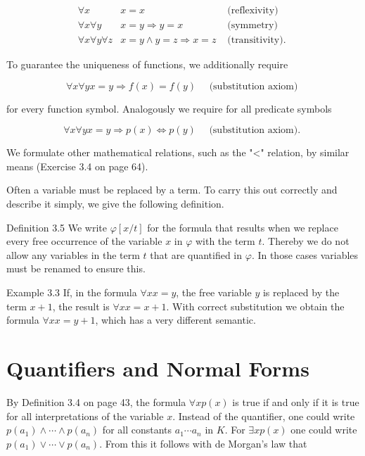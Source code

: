 \documentclass[10pt]{book}
\begin{document}
\[
\begin{array}{rll}
\forall x & x=x & \text { (reflexivity) } \\
\forall x \forall y & x=y \Rightarrow y=x & \text { (symmetry) }  \tag{3.1}\\
\forall x \forall y \forall z & x=y \wedge y=z \Rightarrow x=z & \text { (transitivity). }
\end{array}
\]

To guarantee the uniqueness of functions, we additionally require


\begin{equation*}
\forall x \forall y x=y \Rightarrow f(x)=f(y) \quad \text { (substitution axiom) } \tag{3.2}
\end{equation*}


for every function symbol. Analogously we require for all predicate symbols


\begin{equation*}
\forall x \forall y x=y \Rightarrow p(x) \Leftrightarrow p(y) \quad \text { (substitution axiom). } \tag{3.3}
\end{equation*}


We formulate other mathematical relations, such as the "<" relation, by similar means (Exercise 3.4 on page 64).

Often a variable must be replaced by a term. To carry this out correctly and describe it simply, we give the following definition.

Definition 3.5 We write $\varphi[x / t]$ for the formula that results when we replace every free occurrence of the variable $x$ in $\varphi$ with the term $t$. Thereby we do not allow any variables in the term $t$ that are quantified in $\varphi$. In those cases variables must be renamed to ensure this.

Example 3.3 If, in the formula $\forall x x=y$, the free variable $y$ is replaced by the term $x+1$, the result is $\forall x x=x+1$. With correct substitution we obtain the formula $\forall x x=y+1$, which has a very different semantic.

\section{Quantifiers and Normal Forms}
By Definition 3.4 on page 43, the formula $\forall x p(x)$ is true if and only if it is true for all interpretations of the variable $x$. Instead of the quantifier, one could write $p\left(a_{1}\right) \wedge \cdots \wedge p\left(a_{n}\right)$ for all constants $a_{1} \cdots a_{n}$ in $K$. For $\exists x p(x)$ one could write $p\left(a_{1}\right) \vee \cdots \vee p\left(a_{n}\right)$. From this it follows with de Morgan's law that
\end{document}
